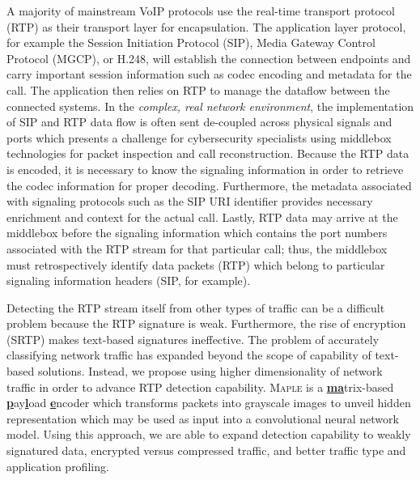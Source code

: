 A majority of mainstream VoIP protocols use the real-time transport protocol (RTP) as their transport layer for encapsulation. The application layer protocol, for example the Session Initiation Protocol (SIP), Media Gateway Control Protocol (MGCP), or H.248, will establish the connection between endpoints and carry important session information such as codec encoding and metadata for the call. The application then relies on RTP to manage the dataflow between the connected systems. In the \textit{complex, real network environment}, the implementation of SIP and RTP data flow is often sent de-coupled across physical signals and ports which presents a challenge for cybersecurity specialists using middlebox technologies for packet inspection and call reconstruction. Because the RTP data is encoded, it is necessary to know the signaling information in order to retrieve the codec information for proper decoding. Furthermore, the metadata associated with signaling protocols such as the SIP URI identifier provides necessary enrichment and context for the actual call. Lastly, RTP data may arrive at the middlebox before the signaling information which contains the port numbers associated with the RTP stream for that particular call; thus, the middlebox must retrospectively identify data packets (RTP) which belong to particular signaling information headers (SIP, for example).

Detecting the RTP stream itself from other types of traffic can be a difficult problem because the RTP signature is weak. Furthermore, the rise of encryption (SRTP) makes text-based signatures ineffective. The problem of accurately classifying network traffic has expanded beyond the scope of capability of text-based solutions. Instead, we propose using higher dimensionality of network traffic in order to advance RTP detection capability. \textsc{Maple} is a \underline{\textbf{ma}}trix-based \underline{\textbf{p}}ay\underline{\textbf{l}}oad \underline{\textbf{e}}ncoder which transforms packets into grayscale images to unveil hidden representation which may be used as input into a convolutional neural network model. Using this approach, we are able to expand detection capability to weakly signatured data, encrypted versus compressed traffic, and better traffic type and application profiling.
